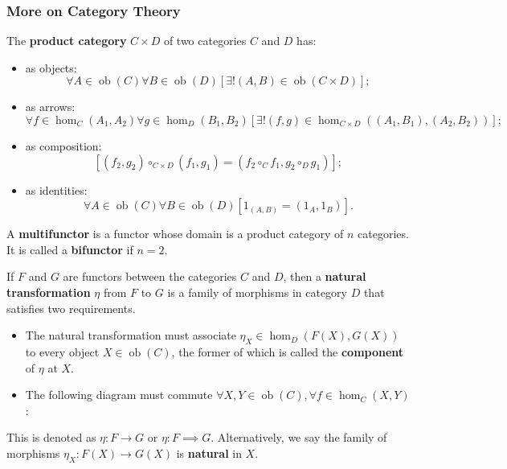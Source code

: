 \documentclass[12pt, letterpaper]{article}
\newcommand{\ob}{\operatorname{ob}}
\theoremstyle{definition}
\theoremstyle{remark}
\theoremstyle{definition}
\theoremstyle{plain}
\numberwithin{equation}{section}
\begin{document}
	\subsubsection{More on Category Theory}
	\begin{def*}
		The \textbf{product category} $C \times D$ of two categories $C$ and $D$ has:
		
		\begin{itemize}
			\item as objects:
			\[\forall A \in \ob(C) \forall B \in \ob(D) [\exists!(A, B)\in \ob(C\times D)];\]
			\item as arrows:
			\[\forall f \in \hom_C(A_1,A_2) \forall g \in \hom_D(B_1,B_2)
			[\exists! (f,g)\in \hom_{C\times D}((A_1, B_1), (A_2, B_2))];\]
			\item as composition:
			\[
			[(f_2, g_2) \circ_{C\times D} (f_1, g_1) = (f_2 \circ_{C} f_1, g_2 \circ_{D} g_1)];\]
			\item as identities:
			\[ \forall A \in \ob(C) \forall B \in \ob(D)
			[1_{(A, B)} = (1_A, 1_B)]. \]
			
		\end{itemize}
	\end{def*}
	\begin{def*}[multifunctor]
		A \textbf{multifunctor} is a functor whose domain is a product category of $n$ categories.
		It is called a \textbf{bifunctor} if $n=2$.
	\end{def*}
	\begin{def*}
		If $F$ and $G$ are functors between the categories $C$ and $D$,
		then a \textbf{natural transformation} $\eta$ from $F$ to $G$ is a family of morphisms
		in category $D$ that satisfies two requirements.
		\begin{itemize}
			\item The natural transformation must associate $\eta_X\in\hom_D(F(X), G(X))$ to every object $X \in \ob(C)$,
			the former of which is called the \textbf{component} of $\eta$ at $X$.
			\item The following diagram must commute $\forall X,Y \in \ob(C), \forall f \in \hom_C(X,Y)$:
			\begin{center}
			\end{center}
		\end{itemize}
		This is denoted as $\eta\colon F\to G$ or $\eta\colon F\implies G$.
		Alternatively, we say the family of morphisms $\eta_{X}\colon F(X)\to G(X)$ is \textbf{natural} in $X$.
	\end{def*}
\end{document}

